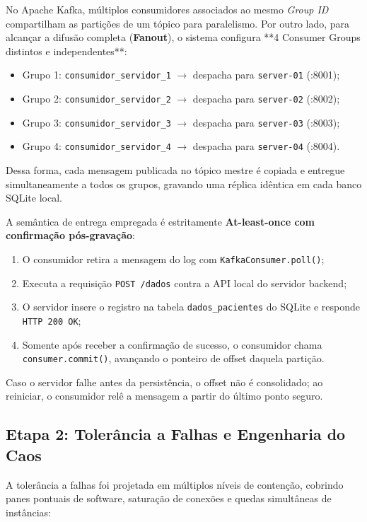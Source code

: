 \documentclass[12pt,a4paper]{article}
\begin{document}
\begin{destaque}
	No Apache Kafka, múltiplos consumidores associados ao mesmo \textit{Group ID} compartilham as partições de um tópico para paralelismo. Por outro lado, para alcançar a difusão completa (\textbf{Fanout}), o sistema configura **4 Consumer Groups distintos e independentes**:
	\begin{itemize}
		\item Grupo 1: \texttt{consumidor\_servidor\_1} $\to$ despacha para \texttt{server-01} (:8001);
		\item Grupo 2: \texttt{consumidor\_servidor\_2} $\to$ despacha para \texttt{server-02} (:8002);
		\item Grupo 3: \texttt{consumidor\_servidor\_3} $\to$ despacha para \texttt{server-03} (:8003);
		\item Grupo 4: \texttt{consumidor\_servidor\_4} $\to$ despacha para \texttt{server-04} (:8004).
	\end{itemize}
	Dessa forma, cada mensagem publicada no tópico mestre é copiada e entregue simultaneamente a todos os grupos, gravando uma réplica idêntica em cada banco SQLite local.
\end{destaque}

A semântica de entrega empregada é estritamente \textbf{At-least-once com confirmação pós-gravação}:
\begin{enumerate}
	\item O consumidor retira a mensagem do log com \texttt{KafkaConsumer.poll()};
	\item Executa a requisição \texttt{POST /dados} contra a API local do servidor backend;
	\item O servidor insere o registro na tabela \texttt{dados\_pacientes} do SQLite e responde \texttt{HTTP 200 OK};
	\item Somente após receber a confirmação de sucesso, o consumidor chama \texttt{consumer.commit()}, avançando o ponteiro de offset daquela partição.
\end{enumerate}

Caso o servidor falhe antes da persistência, o offset não é consolidado; ao reiniciar, o consumidor relê a mensagem a partir do último ponto seguro.

\subsection{Etapa 2: Tolerância a Falhas e Engenharia do Caos}
A tolerância a falhas foi projetada em múltiplos níveis de contenção, cobrindo panes pontuais de software, saturação de conexões e quedas simultâneas de instâncias:
\end{document}
